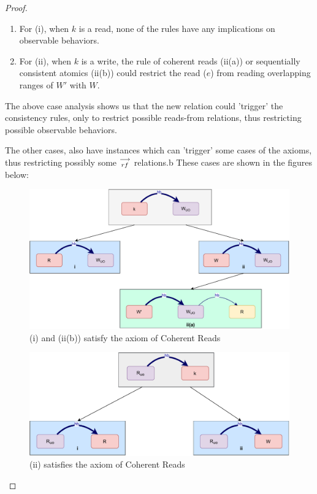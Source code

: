 \begin{proof}
        \begin{enumerate}
            \item For (i), when $k$ is a read, none of the rules have any implications on observable behaviors.
            \item For (ii), when $k$ is a write, the rule of coherent reads (ii(a)) or sequentially consistent atomics (ii(b)) could restrict the read ($e$) from reading overlapping ranges of $W'$ with $W$.
        \end{enumerate}
        
        The above case analysis shows us that the new relation could 'trigger' the consistency rules, only to restrict possible reads-from relations, thus restricting possible observable behaviors. 

        The other cases, also have instances which can 'trigger' some cases of the axioms, thus restricting possibly some $\stackrel{\longrightarrow}{_{rf}}$ relations.b These cases are shown in the figures below: 
        \begin{figure}[H]
            \centering
            \includegraphics[scale=0.6]{Q3_(c)Case2.pdf}
            \caption{(i) and (ii(b)) satisfy the axiom of Coherent Reads}
            \label{fig:my_label}
        \end{figure}
              
        \begin{figure}[H]
            \centering
            \includegraphics[scale=0.6]{Q3_(d)Case3.pdf}
            \caption{(ii) satisfies the axiom of Coherent Reads}
            \label{fig:my_label}
        \end{figure}
        

\end{proof}
